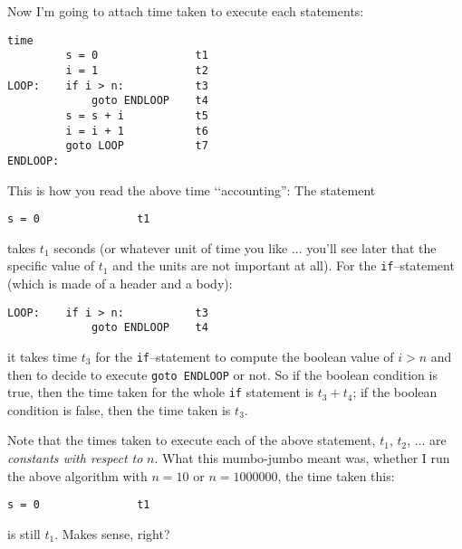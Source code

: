 Now I'm going to attach time taken to execute each statements:
\begin{Verbatim}[frame=single,fontsize=\footnotesize]
                             time
         s = 0               t1 
         i = 1               t2 
LOOP:    if i > n:           t3  
             goto ENDLOOP    t4
         s = s + i           t5
         i = i + 1           t6
         goto LOOP           t7
ENDLOOP:
\end{Verbatim}
This is how you read the above time \lq\lq accounting'':
The statement 
\begin{Verbatim}[frame=single,fontsize=\footnotesize]
         s = 0               t1
\end{Verbatim}
takes $t_1$ seconds (or whatever unit of time
you like ... you'll see later that the specific value of 
$t_1$ and the units are not important at all).
For the \verb!if!--statement
(which is made of a header and a body):
\begin{Verbatim}[frame=single,fontsize=\footnotesize]
LOOP:    if i > n:           t3  
             goto ENDLOOP    t4
\end{Verbatim}
it takes time $t_3$ for the \verb!if!--statement
to compute the boolean value of $i > n$ and then to decide
to execute \verb!goto ENDLOOP! or not.
So if the boolean condition is true, then the time taken for the 
whole \verb!if! statement is $t_3 + t_4$;
if the boolean condition is false, then the time taken 
is $t_3$.

Note that the times taken to execute each of the above
statement, $t_1$, $t_2$, ... are
\textit{constants with respect to} $n$.
What this mumbo-jumbo meant was, 
whether I run the above algorithm
with $n = 10$ or $n = 1000000$, 
the time taken this:
\begin{Verbatim}[frame=single,fontsize=\footnotesize]
         s = 0               t1
\end{Verbatim}
is still $t_1$.
Makes sense, right?

